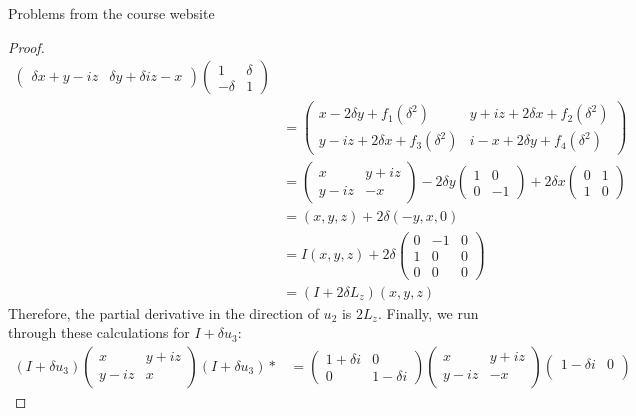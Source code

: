 \documentclass[12pt]{article}
\theoremstyle{definition}
\begin{document}
\begin{section}{Problems from the course website}
\begin{proof}
\begin{align*}
\begin{pmatrix}
		\delta x + y - iz & \delta y + \delta iz - x
	\end{pmatrix}\begin{pmatrix}
	1 & \delta \\ -\delta & 1
	\end{pmatrix}\\
	&= \begin{pmatrix}
		x - 2 \delta y + f_1(\delta^2) & y + iz + 2\delta x + f_2(\delta^2)\\
		y - iz + 2\delta x + f_3(\delta^2) &  i-x + 2 \delta y + f_4(\delta^2)
	\end{pmatrix}\\
	&= \begin{pmatrix}
		x & y + iz \\
		y - iz & -x
	\end{pmatrix} - 2\delta y \begin{pmatrix}
		1 & 0 \\ 0 & -1
	\end{pmatrix} + 2 \delta x \begin{pmatrix}
		0 & 1 \\1 & 0
	\end{pmatrix}\\
	&= (x,y,z) + 2\delta (-y, x, 0)\\
	&= I (x,y,z) + 2\delta \begin{pmatrix}
		0 & -1 & 0 \\
		1 & 0 & 0\\
		0 & 0 & 0
	\end{pmatrix}\\
	&= (I + 2\delta L_z)(x,y,z)
\end{align*} 
Therefore, the partial derivative in the direction of $u_2$ is $2L_z$. Finally, we run through these calculations for $I + \delta u_3$:
\begin{align*}
	(I + \delta u_3)\begin{pmatrix}
		x & y + iz \\
		y - iz & x
	\end{pmatrix}(I + \delta u_3)* &= \begin{pmatrix}
		1 + \delta i & 0 \\
		0 & 1 - \delta i
	\end{pmatrix} \begin{pmatrix}
		x & y + iz \\
		y - iz & -x
	\end{pmatrix}\begin{pmatrix}
		1 - \delta i & 0 \\

\end{pmatrix}
\end{align*}
\end{proof}
\end{section}
\end{document}
